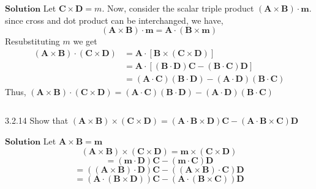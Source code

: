 $\boxed{\textbf{Solution}}$ Let $\mathbf{C} \times \mathbf{D}=m$.
Now, consider the scalar triple product $(\mathbf{A} \times \mathbf{B}) \cdot \mathbf{m}$.
since cross and dot product can be interchanged, we have,
$$
(\mathbf{A} \times \mathbf{B}) \cdot \mathbf{m}=\mathbf{A} \cdot(\mathbf{B} \times \mathbf{m})
$$
Resubstituting $m$ we get
$$\begin{aligned}(\mathbf{A} \times \mathbf{B}) \cdot(\mathbf{C} \times \mathbf{D}) &=\mathbf{A} \cdot[\mathbf{B} \times(\mathbf{C} \times \mathbf{D})] \\ &=\mathbf{A} \cdot[(\mathbf{B} \cdot \mathbf{D}) \mathbf{C}-(\mathbf{B} \cdot \mathbf{C})\mathbf{D}] \\ &=(\mathbf{A} \cdot \mathbf{C})(\mathbf{B} \cdot \mathbf{D})-(\mathbf{A} \cdot \mathbf{D})(\mathbf{B} \cdot \mathbf{C}) \end{aligned}$$
Thus, $(\mathbf{A} \times \mathbf{B}) \cdot(\mathbf{C} \times \mathbf{D})=(\mathbf{A} \cdot \mathbf{C})(\mathbf{B} \cdot \mathbf{D})-(\mathbf{A} \cdot \mathbf{D})(\mathbf{B} \cdot \mathbf{C})$

$$$$

\begin{mybox}{3.2.14}
Show that
$(\mathbf{A} \times \mathbf{B}) \times(\mathbf{C} \times \mathbf{D})=(\mathbf{A} \cdot \mathbf{B} \times \mathbf{D}) \mathbf{C}-(\mathbf{A} \cdot \mathbf{B} \times \mathbf{C}) \mathbf{D}$
\end{mybox}
$\boxed{\textbf{Solution}}$ Let $\mathbf{A} \times \mathbf{B}=\mathbf{m}$
$$(\mathbf{A} \times \mathbf{B}) \times(\mathbf{C} \times \mathbf{D})=\mathbf{m} \times(\mathbf{C} \times \mathbf{D})$$
$$=(\mathbf{m} \cdot \mathbf{D}) \mathbf{C}-(\mathbf{m} \cdot \mathbf{C})\mathbf{D}$$
$$=((\mathbf{A} \times \mathbf{B}) \cdot \mathbf{D}) \mathbf{C}-((\mathbf{A} \times \mathbf{B}) \cdot \mathbf{C})\mathbf{D}$$
$$=(\mathbf{A} \cdot(\mathbf{B} \times \mathbf{D})) \mathbf{C}-(\mathbf{A} \cdot(\mathbf{B} \times \mathbf{C}))\mathbf{D}$$


\newpage


